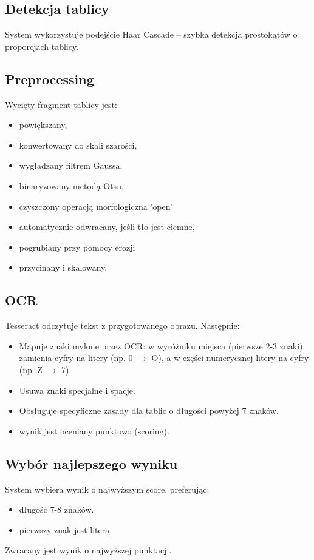 \documentclass[12pt,a4paper]{article}
\begin{document}
\subsection{Detekcja tablicy}
System wykorzystuje podejście Haar Cascade – szybka detekcja prostokątów o proporcjach tablicy.

\subsection{Preprocessing}
Wycięty fragment tablicy jest:
\begin{itemize}
    \item powiększany,
    \item konwertowany do skali szarości,
    \item wygładzany filtrem Gaussa,
    \item binaryzowany metodą Otsu,
    \item czyszczony operacją morfologiczna 'open'
    \item automatycznie odwracany, jeśli tło jest ciemne,
    \item pogrubiany przy pomocy erozji
    \item przycinany i skalowany.
\end{itemize}

\subsection{OCR}
Tesseract odczytuje tekst z przygotowanego obrazu.  
Następnie:
\begin{itemize}
    \item Mapuje znaki mylone przez OCR: w wyróżniku miejsca (pierwsze 2-3 znaki) zamienia cyfry na litery (np. 0 $\to$ O), a w części numerycznej litery na cyfry (np. Z $\to$ 7).
    \item Usuwa znaki specjalne i spacje.
    \item Obsługuje specyficzne zasady dla tablic o długości powyżej 7 znaków.
    \item wynik jest oceniany punktowo (scoring).
\end{itemize}

\subsection{Wybór najlepszego wyniku}
System wybiera wynik o najwyższym score, preferując:
\begin{itemize}
    \item długość 7-8 znaków.
    \item pierwszy znak jest literą.
\end{itemize}
Zwracany jest wynik o najwyższej punktacji.
\end{document}
